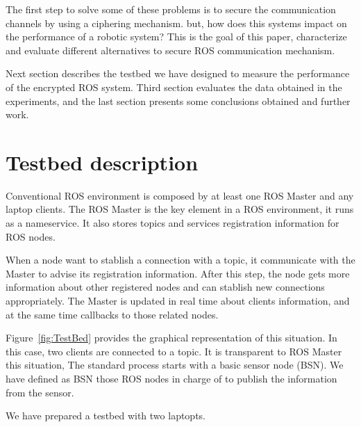 \documentclass[journal,twoside]{JoPhA}
\begin{document}
The first step to solve some of these problems is to secure the communication channels by using a ciphering mechanism. but, how does this systems impact on the performance of a robotic system? This is the goal of this paper, characterize and evaluate different alternatives to secure ROS communication mechanism.


Next section describes the testbed we have designed to measure the performance of the encrypted ROS system. Third section evaluates the data obtained in the experiments, and the last section presents some conclusions obtained and further work.



\section{Testbed description}

Conventional ROS environment is composed by at least one ROS Master and any laptop clients. The ROS Master is the key element in a ROS environment, it runs as a nameservice.
It also stores topics and services registration information for ROS nodes. 

When a node want to stablish a connection with a topic, it communicate with the Master to advise its registration information. After this step, the node gets more information about other registered nodes and can stablish new connections appropriately. The Master is updated in real time about clients information, and at the same time callbacks to those related nodes.




Figure~\ref{fig:TestBed} provides the graphical representation of this situation. In this case, two clients are connected to a topic. It is transparent to ROS Master this situation,  
The standard process starts with a basic sensor node (BSN). We have defined as BSN those ROS nodes in charge of to publish the information from the sensor.



We have prepared a  testbed with two laptopts.

\end{document}
